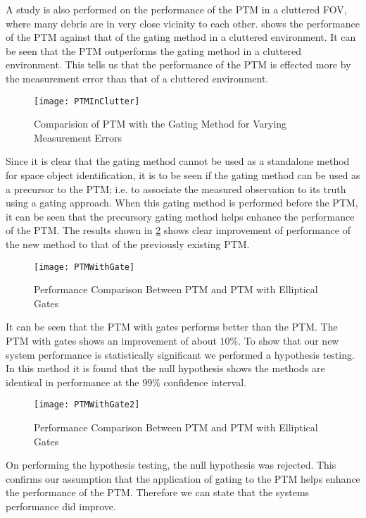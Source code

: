\documentclass[]{aiaa-tc}%
\begin{document}
A study is also performed on the performance of the PTM in a cluttered FOV, where many debris are in very close vicinity to each other.  shows the performance of the PTM against that of the gating method in a cluttered environment. It can be seen that the PTM outperforms the gating method in a cluttered environment. This tells us that the performance of the PTM is effected more by the measurement error than that of a cluttered environment.\\

\begin{figure}[h]
\centering
\texttt{[image: PTMInClutter]}
\caption{Comparision of PTM with the Gating Method for Varying Measurement Errors}
\label{PTMInClutter}
\end{figure}

Since it is clear that the gating method cannot be used as a standalone method for space object identification, it is to be seen if the gating method can be used as a precursor to the PTM; i.e. to associate the measured observation to its truth using a gating approach. When this gating method is performed before the PTM, it can be seen that the precursory gating method helps enhance the performance of the PTM. The results shown in \cref{PTMWithGate} shows clear improvement of performance of the new method to that of the previously existing PTM.\\

\begin{figure}[h]
\centering
\texttt{[image: PTMWithGate]}
\caption{Performance Comparison Between PTM and PTM with Elliptical Gates}
\label{PTMWithGate}
\end{figure}

It can be seen that the PTM with gates performs better than the PTM. The PTM with gates shows an improvement of about $10 \%$. To show that our new system performance is statistically significant we performed a hypothesis testing. In this method it is found that the null hypothesis shows the methods are identical in performance at the $99\%$ confidence interval.\\

\begin{figure}[h]
\centering
\texttt{[image: PTMWithGate2]}
\caption{Performance Comparison Between PTM and PTM with Elliptical Gates}
\label{PTMWithGate2}
\end{figure}

On performing the hypothesis testing, the null hypothesis was rejected. This confirms our assumption that the application of gating to the PTM helps enhance the performance of the PTM. Therefore we can state that the systems performance did improve. \\
 
\end{document}
